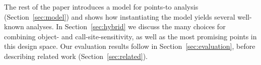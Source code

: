 The rest of the paper introduces a model for points-to analysis
(Section~\ref{sec:model}) and shows how instantiating the model yields
several well-known analyses. In Section~\ref{sec:hybrid} we discuss the many
choices for combining object- and call-site-sensitivity, as well as
the most promising points in this design space. Our evaluation results
follow in Section~\ref{sec:evaluation}, before describing related work
(Section~\ref{sec:related}).



